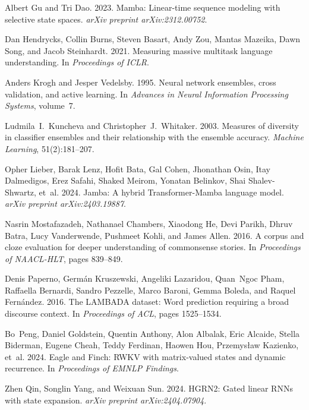 \documentclass[11pt]{article}
\begin{document}
\begin{thebibliography}{}
Albert Gu and Tri Dao. 2023.
Mamba: Linear-time sequence modeling with selective state spaces.
\textit{arXiv preprint arXiv:2312.00752}.

Dan Hendrycks, Collin Burns, Steven Basart, Andy Zou, Mantas Mazeika, Dawn Song, and Jacob Steinhardt. 2021.
Measuring massive multitask language understanding.
In \textit{Proceedings of ICLR}.

Anders Krogh and Jesper Vedelsby. 1995.
Neural network ensembles, cross validation, and active learning.
In \textit{Advances in Neural Information Processing Systems}, volume~7.

Ludmila~I.\ Kuncheva and Christopher~J.\ Whitaker. 2003.
Measures of diversity in classifier ensembles and their relationship with the ensemble accuracy.
\textit{Machine Learning}, 51(2):181--207.

Opher Lieber, Barak Lenz, Hofit Bata, Gal Cohen, Jhonathan Osin, Itay Dalmedigos, Erez Safahi, Shaked Meirom, Yonatan Belinkov, Shai Shalev-Shwartz, et~al. 2024.
Jamba: A hybrid Transformer-Mamba language model.
\textit{arXiv preprint arXiv:2403.19887}.

Nasrin Mostafazadeh, Nathanael Chambers, Xiaodong He, Devi Parikh, Dhruv Batra, Lucy Vanderwende, Pushmeet Kohli, and James Allen. 2016.
A corpus and cloze evaluation for deeper understanding of commonsense stories.
In \textit{Proceedings of NAACL-HLT}, pages 839--849.

Denis Paperno, Germ{\'a}n Kruszewski, Angeliki Lazaridou, Quan~Ngoc Pham, Raffaella Bernardi, Sandro Pezzelle, Marco Baroni, Gemma Boleda, and Raquel Fern{\'a}ndez. 2016.
The LAMBADA dataset: Word prediction requiring a broad discourse context.
In \textit{Proceedings of ACL}, pages 1525--1534.

Bo~Peng, Daniel Goldstein, Quentin Anthony, Alon Albalak, Eric Alcaide, Stella Biderman, Eugene Cheah, Teddy Ferdinan, Haowen Hou, Przemys{\l}aw Kazienko, et~al. 2024.
Eagle and Finch: RWKV with matrix-valued states and dynamic recurrence.
In \textit{Proceedings of EMNLP Findings}.

Zhen Qin, Songlin Yang, and Weixuan Sun. 2024.
HGRN2: Gated linear RNNs with state expansion.
\textit{arXiv preprint arXiv:2404.07904}.


\end{thebibliography}
\end{document}
